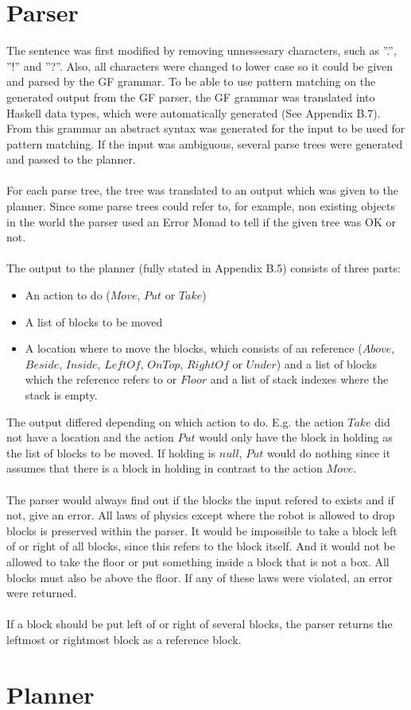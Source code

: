 \section{Parser}
The sentence was first modified by removing unnessesary characters, such as ''.'', ''!'' and ''?''. Also, all characters were changed to lower case so it could be given and parsed by the GF grammar. To be able to use pattern matching on the generated output from the GF parser, the GF grammar was translated into Haskell data types, which were automatically generated (See Appendix B.7). From this grammar an abstract syntax was generated for the input to be used for pattern matching. If the input was ambiguous, several parse trees were generated and passed to the planner. \\\\
For each parse tree, the tree was translated to an output which was given to the planner. Since some parse trees could refer to, for example, non existing objects in the world the parser used an Error Monad to tell if the given tree was OK or not. \\\\
The output to the planner (fully stated in Appendix B.5) consists of three parts:
\begin{itemize}
\item An action to do ($Move$, $Put$ or $Take$)
\item A list of blocks to be moved
\item A location where to move the blocks, which consists of an reference ($Above$, $Beside$, $Inside$, $LeftOf$, $OnTop$, $RightOf$ or $Under$) and a list of blocks which the reference refers to or $Floor$ and a list of stack indexes where the stack is empty.
\end{itemize}
The output differed depending on which action to do. E.g. the action $Take$ did not have a location and the action $Put$ would only have the block in holding as the list of blocks to be moved. If holding is $null$, $Put$ would do nothing since it assumes that there is a block in holding in contrast to the action $Move$.\\\\
The parser would always find out if the blocks the input refered to exists and if not, give an error. All laws of physics except where the robot is allowed to drop blocks is preserved within the parser. It would be impossible to take a block left of or right of all blocks, since this refers to the block itself. And it would not be allowed to take the floor or put something inside a block that is not a box. All blocks must also be above the floor. If any of these laws were violated, an error were returned.
 \\\\
If a block should be put left of or right of several blocks, the parser returns the leftmost or rightmost block as a reference block. 

\section{Planner}


